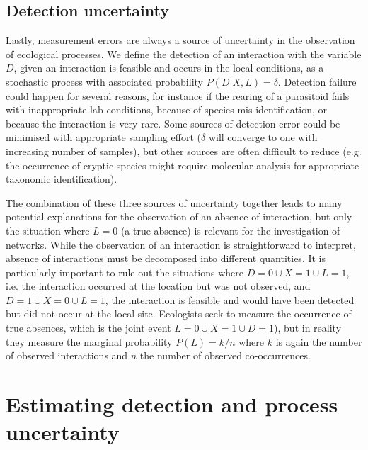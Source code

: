 \documentclass[12pt]{article}
\begin{document}
    \subsection*{Detection uncertainty} 

    Lastly, measurement errors are always a source of uncertainty in the observation of ecological processes. We define the detection of an interaction with the variable $D$, given an interaction is feasible and occurs in the local conditions, as a stochastic process with associated probability $P(D|X,L)=\delta$. Detection failure could happen for several reasons, for instance if the rearing of a parasitoid fails with inappropriate lab conditions, because of species mis-identification, or because the interaction is very rare. Some sources of detection error could be minimised with appropriate sampling effort ($\delta$ will converge to one with increasing number of samples), but other sources are often difficult to reduce (e.g. the occurrence of cryptic species might require molecular analysis for appropriate taxonomic identification).



    The combination of these three sources of uncertainty together leads to many potential explanations for the observation of an absence of interaction, but only the situation where $L = 0$ (a true absence) is relevant for the investigation of networks. While the observation of an interaction is straightforward to interpret, absence of interactions must be decomposed into different quantities. It is particularly important to rule out the situations where $D=0 \cup X = 1 \cup L=1$, i.e. the interaction occurred at the location but was not observed, and $D=1 \cup X = 0 \cup L =1$, the interaction is feasible and would have been detected but did not occur at the local site. Ecologists seek to measure the occurrence of true absences, which is the joint event $L=0 \cup X=1 \cup D=1$), but in reality they measure the marginal probability $P(L) = k/n$ where $k$ is again the number of observed interactions and $n$ the number of observed co-occurrences.


\section*{Estimating detection and process uncertainty}
\end{document}

